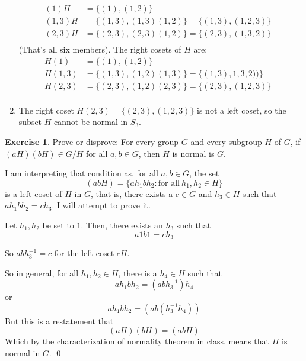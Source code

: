 \documentclass[11pt,oneside]{article}
\numberwithin{equation}{section}
\theoremstyle{definition}
\newtheorem{exercise}{Exercise}
\begin{document}
\begin{solution}
\begin{enumerate}
      \begin{align*}
        (1)H & = \{ (1), (1, 2) \} & \\
        (1, 3)H & = \{ (1,3), (1,3)(1,2) \} = \{ (1,3), (1, 2, 3) \} & \\
        (2, 3)H & = \{ (2,3), (2, 3)(1, 2) \} = \{ (2, 3), (1, 3, 2) \} & \\
      \end{align*}
      (That's all six members).  The right cosets of $H$ are:
      \begin{align*}
        H(1) & = \{ (1), (1, 2) \} & \\
        H(1, 3) &= \{ (1,3), (1,2)(1,3) \} = \{ (1,3), 1, 3, 2)) \} & \\
        H(2, 3) & = \{ (2,3), (1, 2)(2, 3) \} = \{ (2, 3), (1, 2, 3) \} & \\
      \end{align*}
    \item
      The right coset $H (2, 3) = \{ (2, 3), (1, 2, 3) \} $ is not a left coset, so
      the subset $H$ cannot be normal in $S_3$.

  \end{enumerate}
\end{solution}

\begin{exercise}
  Prove or disprove: For every group $G$ and every subgroup $H$ of
  $G$, if $(aH)(bH) \in G / H$ for all $a, b \in G$, then $H$ is
  normal is $G$.
\end{exercise}
\begin{solution}
  I am interpreting that condition as, for all $a, b \in G$, the set
  $$ 
  (abH) = \{ a h_1 b h_2: \text{for all} \ h_1, h_2 \in H \}
  $$
  is a left coset of $H$ in $G$, that is, there exists a
  $c \in G$ and $h_3 \in H$ such that $a h_1 b h_2 = c h_3$.
  I will attempt to prove it.

  Let $h_1, h_2$ be set to $1$. Then, there exists an $h_3$ such that
  $$
  a 1 b 1 = c h_3
  $$

  So $ a b h_3 ^{-1} = c$ for the left coset $cH$.

  So in general, for all $h_1, h_2 \in H$, there is a $h_4 \in H$ such that
  $$
  a h_1 b h_2 = (a b h_3 ^  { -1} ) h_4
  $$
  or
  $$
  a h_1 b h_2 = ( a b ( h_3 ^ {-1} h_4))
  $$
  But this is a restatement that
  $$
  (aH)(bH) = (abH)
  $$
  Which by the characterization of normality theorem in class, means that $H$ is normal in $G$.  
  \qed
\end{solution}

\begin{comment}
  \begin{exercise}
    problem
  \end{exercise}
  \begin{solution}
    \begin{enumerate}[(a)]
    \item
      first answer
    \end{enumerate}
  \end{solution}
\end{comment}
\end{document}
